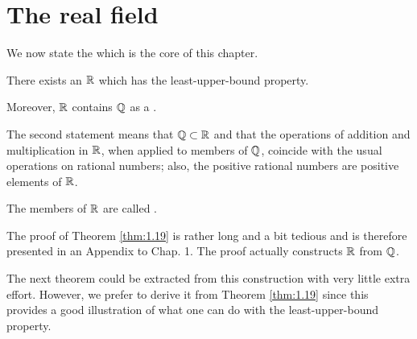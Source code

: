 
\section{The real field}

We now state the  which is the core of this chapter.

\begin{thm}
    \label{thm:1.19}
    There exists an  ${\protect\mathbb R}$ 
    which has the least-upper-bound property.

    Moreover, ${\protect\mathbb R}$ contains ${\protect\mathbb Q} $ as a .
\end{thm}

The second statement means that ${\protect\mathbb Q} \subset {\protect\mathbb R}$ 
and that the operations of addition and multiplication in ${\protect\mathbb R}$, 
when applied to members of ${\protect\mathbb Q} $, 
coincide with the usual operations on rational numbers; 
also, the positive rational numbers are positive elements of ${\protect\mathbb R}$.

The members of ${\protect\mathbb R}$ are called .

The proof of Theorem \ref{thm:1.19} is rather long and a bit tedious 
and is therefore presented in an Appendix to Chap. 1. The proof actually constructs ${\protect\mathbb R}$ from ${\protect\mathbb Q}$.

The next theorem could be extracted from this construction with very
little extra effort. 
However, we prefer to derive it from Theorem \ref{thm:1.19} since this
provides a good illustration of what one can do with the least-upper-bound property.


